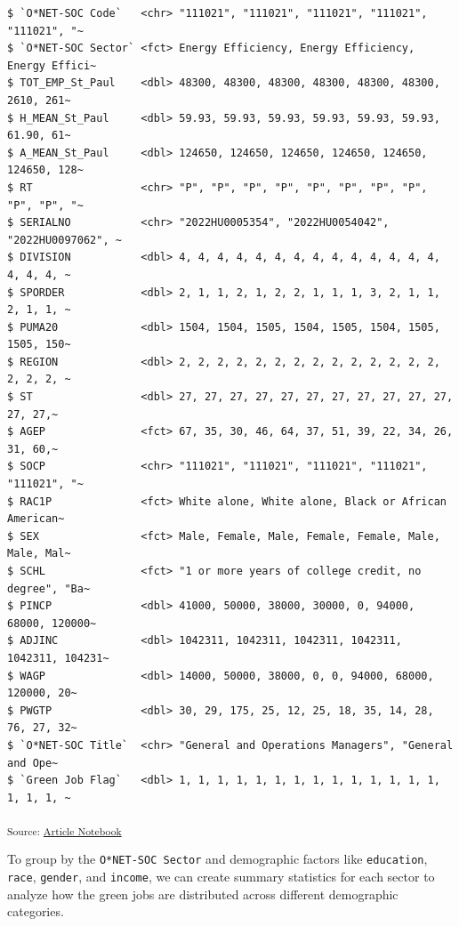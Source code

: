 \documentclass[
  letterpaper,
  DIV=11,
  numbers=noendperiod]{scrartcl}
\begin{document}
\begin{verbatim}
$ `O*NET-SOC Code`   <chr> "111021", "111021", "111021", "111021", "111021", "~
$ `O*NET-SOC Sector` <fct> Energy Efficiency, Energy Efficiency, Energy Effici~
$ TOT_EMP_St_Paul    <dbl> 48300, 48300, 48300, 48300, 48300, 48300, 2610, 261~
$ H_MEAN_St_Paul     <dbl> 59.93, 59.93, 59.93, 59.93, 59.93, 59.93, 61.90, 61~
$ A_MEAN_St_Paul     <dbl> 124650, 124650, 124650, 124650, 124650, 124650, 128~
$ RT                 <chr> "P", "P", "P", "P", "P", "P", "P", "P", "P", "P", "~
$ SERIALNO           <chr> "2022HU0005354", "2022HU0054042", "2022HU0097062", ~
$ DIVISION           <dbl> 4, 4, 4, 4, 4, 4, 4, 4, 4, 4, 4, 4, 4, 4, 4, 4, 4, ~
$ SPORDER            <dbl> 2, 1, 1, 2, 1, 2, 2, 1, 1, 1, 3, 2, 1, 1, 2, 1, 1, ~
$ PUMA20             <dbl> 1504, 1504, 1505, 1504, 1505, 1504, 1505, 1505, 150~
$ REGION             <dbl> 2, 2, 2, 2, 2, 2, 2, 2, 2, 2, 2, 2, 2, 2, 2, 2, 2, ~
$ ST                 <dbl> 27, 27, 27, 27, 27, 27, 27, 27, 27, 27, 27, 27, 27,~
$ AGEP               <fct> 67, 35, 30, 46, 64, 37, 51, 39, 22, 34, 26, 31, 60,~
$ SOCP               <chr> "111021", "111021", "111021", "111021", "111021", "~
$ RAC1P              <fct> White alone, White alone, Black or African American~
$ SEX                <fct> Male, Female, Male, Female, Female, Male, Male, Mal~
$ SCHL               <fct> "1 or more years of college credit, no degree", "Ba~
$ PINCP              <dbl> 41000, 50000, 38000, 30000, 0, 94000, 68000, 120000~
$ ADJINC             <dbl> 1042311, 1042311, 1042311, 1042311, 1042311, 104231~
$ WAGP               <dbl> 14000, 50000, 38000, 0, 0, 94000, 68000, 120000, 20~
$ PWGTP              <dbl> 30, 29, 175, 25, 12, 25, 18, 35, 14, 28, 76, 27, 32~
$ `O*NET-SOC Title`  <chr> "General and Operations Managers", "General and Ope~
$ `Green Job Flag`   <dbl> 1, 1, 1, 1, 1, 1, 1, 1, 1, 1, 1, 1, 1, 1, 1, 1, 1, ~
\end{verbatim}

\textsubscript{Source:
\href{https://beeckcenter.github.io/climate-equity-workforce/index-preview.html}{Article
Notebook}}

To group by the \texttt{O*NET-SOC\ Sector} and demographic factors like
\texttt{education}, \texttt{race}, \texttt{gender}, and \texttt{income},
we can create summary statistics for each sector to analyze how the
green jobs are distributed across different demographic categories.
\end{document}
